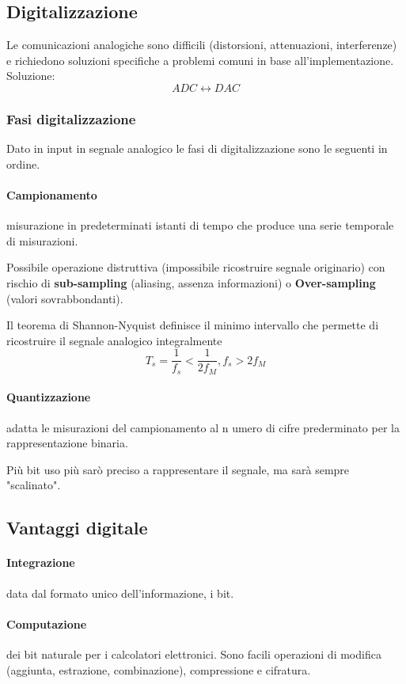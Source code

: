 \subsection{Digitalizzazione}
Le comunicazioni analogiche sono difficili (distorsioni, attenuazioni, interferenze) e richiedono soluzioni specifiche a problemi comuni in base all'implementazione. Soluzione:\[ADC\longleftrightarrow DAC\]
\subsubsection{Fasi digitalizzazione}
Dato in input in segnale analogico le fasi di digitalizzazione sono le seguenti in ordine.
\paragraph{Campionamento} misurazione in predeterminati istanti di tempo che produce una serie temporale di misurazioni.

Possibile operazione distruttiva (impossibile ricostruire segnale originario) con rischio di \textbf{sub-sampling} (aliasing, assenza informazioni) o \textbf{Over-sampling} (valori sovrabbondanti).

Il teorema di Shannon-Nyquist definisce il minimo intervallo che permette di ricostruire il segnale analogico integralmente \[T_s=\frac{1}{f_s}<\frac{1}{2f_M}, f_s>2f_M\]
\paragraph{Quantizzazione} adatta le misurazioni del campionamento al n umero di cifre prederminato per la rappresentazione binaria.

Più bit uso più sarò preciso a rappresentare il segnale, ma sarà sempre "scalinato".
\subsection{Vantaggi digitale}
\paragraph{Integrazione} data dal formato unico dell'informazione, i bit.
\paragraph{Computazione} dei bit naturale per i calcolatori elettronici. Sono facili operazioni di modifica (aggiunta, estrazione, combinazione), compressione e cifratura.
